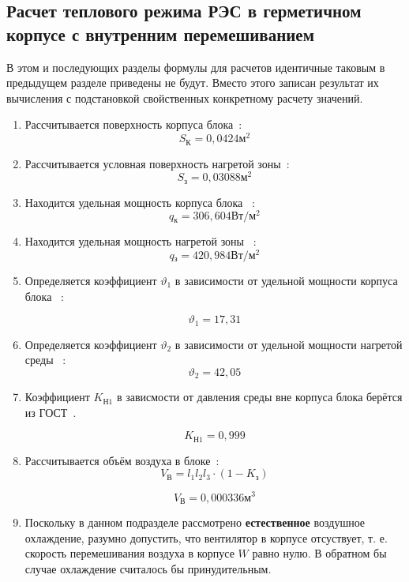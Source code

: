\subsection{Расчет теплового режима РЭС в герметичном корпусе с внутренним перемешиванием}

В этом и последующих разделы формулы для расчетов идентичные таковым в
предыдущем разделе приведены не будут. Вместо этого записан результат
их вычисления с подстановкой свойственных конкретному расчету
значений.

\begin{enumerate}[label={\arabic*.}]
\item Рассчитывается поверхность корпуса блока~\cite{Rotkop1976}: %
  $$S\mathrm{_{К}}=0,0424\mathrm{м^2}$$
\item Рассчитывается условная поверхность нагретой зоны~\cite{Rotkop1976}: %
  $$S\mathrm{_{з}} = 0,03088\mathrm{м^2}$$ 
\item Находится удельная мощность корпуса блока ~\cite{Rotkop1976}:  %
  $$q\mathrm{_к} = 306,604\mathrm{Вт/м^2}$$
\item Находится удельная мощность нагретой зоны ~\cite{Rotkop1976}: %
  $$q\mathrm{_з} = 420,984 \mathrm{ Вт/м^2}$$

\item Определяется коэффициент $\vartheta_1$ в зависимости от удельной мощности корпуса блока ~\cite{Rotkop1976}:

  $$\vartheta_1=17,31$$
\item Определяется коэффициент $\vartheta_2$ в зависимости от удельной мощности нагретой среды ~\cite{Rotkop1976}:
  $$\vartheta_2=42,05$$

  \item Коэффициент $K\mathrm{_{Н1}}$ в зависмости от давления
  среды вне корпуса блока берётся из ГОСТ~\cite{GOST-15150-69}.

  $$K\mathrm{_{Н1}} = 0,999$$
\item Рассчитывается объём воздуха в блоке~\cite{Rotkop1976}:
  \begin{equation}
    V\mathrm{_{В}} = l_1 l_2 l_3 \cdot (1 - K\mathrm{_з})
  \end{equation}

  $$V\mathrm{_{В}} = 0,000336\mathrm{м^3}$$

\item Поскольку в данном подразделе
    рассмотрено \textbf{естественное} воздушное охлаждение,
    разумно допустить, что вентилятор в корпусе отсуствует, т. е.
    скорость перемешивания воздуха в корпусе $W$ равно нулю.
    В обратном бы случае охлаждение считалось бы принудительным.


\end{enumerate}
